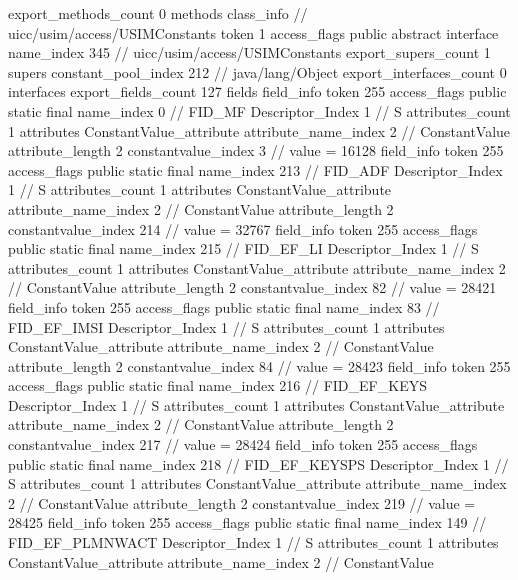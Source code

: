 {{{			export_methods_count	0
			methods {
			}
		}
		class_info {		// uicc/usim/access/USIMConstants
			token	1
			access_flags	public abstract interface
			name_index	345		// uicc/usim/access/USIMConstants
			export_supers_count	1
			supers {
				constant_pool_index	212		// java/lang/Object
			}
			export_interfaces_count	0
			interfaces {
			}
			export_fields_count	127
			fields {
			field_info {
				token	255
				access_flags	public static final
				name_index	0		// FID_MF
				Descriptor_Index	1		// S
				attributes_count	1
				attributes {
				ConstantValue_attribute {
					attribute_name_index	2		// ConstantValue
					attribute_length	2
					constantvalue_index	3		// value = 16128
				}
				}
			}
			field_info {
				token	255
				access_flags	public static final
				name_index	213		// FID_ADF
				Descriptor_Index	1		// S
				attributes_count	1
				attributes {
				ConstantValue_attribute {
					attribute_name_index	2		// ConstantValue
					attribute_length	2
					constantvalue_index	214		// value = 32767
				}
				}
			}
			field_info {
				token	255
				access_flags	public static final
				name_index	215		// FID_EF_LI
				Descriptor_Index	1		// S
				attributes_count	1
				attributes {
				ConstantValue_attribute {
					attribute_name_index	2		// ConstantValue
					attribute_length	2
					constantvalue_index	82		// value = 28421
				}
				}
			}
			field_info {
				token	255
				access_flags	public static final
				name_index	83		// FID_EF_IMSI
				Descriptor_Index	1		// S
				attributes_count	1
				attributes {
				ConstantValue_attribute {
					attribute_name_index	2		// ConstantValue
					attribute_length	2
					constantvalue_index	84		// value = 28423
				}
				}
			}
			field_info {
				token	255
				access_flags	public static final
				name_index	216		// FID_EF_KEYS
				Descriptor_Index	1		// S
				attributes_count	1
				attributes {
				ConstantValue_attribute {
					attribute_name_index	2		// ConstantValue
					attribute_length	2
					constantvalue_index	217		// value = 28424
				}
				}
			}
			field_info {
				token	255
				access_flags	public static final
				name_index	218		// FID_EF_KEYSPS
				Descriptor_Index	1		// S
				attributes_count	1
				attributes {
				ConstantValue_attribute {
					attribute_name_index	2		// ConstantValue
					attribute_length	2
					constantvalue_index	219		// value = 28425
				}
				}
			}
			field_info {
				token	255
				access_flags	public static final
				name_index	149		// FID_EF_PLMNWACT
				Descriptor_Index	1		// S
				attributes_count	1
				attributes {
				ConstantValue_attribute {
					attribute_name_index	2		// ConstantValue
}}}}}}}
